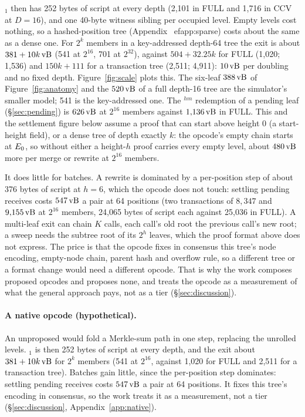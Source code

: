 $_1$ then has 252 bytes of script at every depth (2{,}101 in
FULL and 1{,}716 in CCV at $D = 16$), and one 40-byte witness sibling per
occupied level. Empty levels cost nothing, so a hashed-position tree (Appendix~
ef{app:sparse}) costs about the same as a dense one. For
$2^k$ members in a key-addressed depth-64 tree the exit is about
$381 + 10k\,\mathrm{vB}$ (541 at $2^{16}$\iffullversion, 701 at $2^{32}$\fi), against $504 + 32.25k$
for FULL (1{,}020\iffullversion; 1{,}536\fi) and $150k + 111$ for a transaction tree
(2{,}511\iffullversion; 4{,}911\fi): $10\,\mathrm{vB}$ per doubling and no fixed depth.
\iffullversion Figure~\ref{fig:scale} plots this. The six-leaf
$388\,\mathrm{vB}$ of Figure~\ref{fig:anatomy} and the $520\,\mathrm{vB}$ of a full depth-16
tree are the simulator's smaller model; 541 is the key-addressed one.
\fi
The $^{hm}$ redemption of a pending leaf (\S\ref{sec:pending}) is
$626\,\mathrm{vB}$ at $2^{16}$ members against $1{,}136\,\mathrm{vB}$ in FULL. This and the settlement figure below assume a proof that can start above height 0 (a start-height field), or a dense tree of depth exactly $k$: the opcode's empty chain starts at $E_0$, so without either a height-$h$ proof carries every empty level, about $480\,\mathrm{vB}$ more per merge or rewrite at $2^{16}$ members.

It does little for batches. A rewrite is dominated by a per-position step of about 376 bytes of script at $h = 6$, which the
opcode does not touch: settling pending receives costs $547\,\mathrm{vB}$ a pair
at 64 positions\iffullversion{} (two transactions of $8{,}347$ and
$9{,}155\,\mathrm{vB}$ at $2^{16}$ members, 24{,}065 bytes of script each against
25{,}036 in FULL)\fi. A multi-leaf exit can chain $K$ calls, each call's old root the previous call's new root; a sweep needs the subtree root of its $2^h$ leaves, which the proof format above does not express. The price is that the opcode fixes in
consensus this tree's node encoding, empty-node chain, parent hash and
overflow rule, so a different tree or a format change would need a
different opcode. That is why the work composes proposed opcodes and
proposes none, and treats the opcode as a measurement of what the
general approach pays, not as a tier (\S\ref{sec:discussion}).
\else
\paragraph{A native opcode (hypothetical).} An unproposed
 would fold a Merkle-sum path in one step, replacing
the unrolled levels. $_1$ is then 252 bytes of script at every
depth, and the exit about $381 + 10k\,\mathrm{vB}$ for $2^k$ members (541 at
$2^{16}$, against 1{,}020 for FULL and 2{,}511 for a transaction tree).
Batches gain little, since the per-position step dominates: settling
pending receives costs $547\,\mathrm{vB}$ a pair at 64 positions. It fixes this
tree's encoding in consensus, so the work treats it as a measurement, not
a tier (\S\ref{sec:discussion}, Appendix~\ref{app:native}).
\fi

